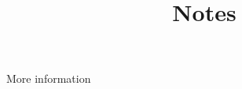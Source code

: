 \documentclass{article}
\begin{document}
\title{Notes}

\maketitle


More information
\end{document}
